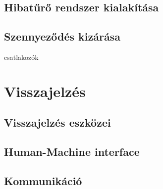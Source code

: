 \subsection{Hibatűrő rendszer kialakítása}

\subsection{Szennyeződés kizárása}
csatlakozók

\section{Visszajelzés}

\subsection{Visszajelzés eszközei}

\subsection{Human-Machine interface}

\subsection{Kommunikáció}
